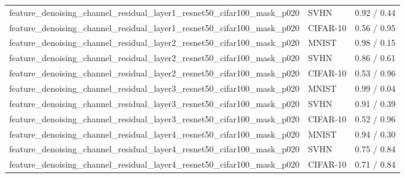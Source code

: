 \begin{tabular}{lll}
feature\_denoising\_channel\_residual\_layer1\_resnet50\_cifar100\_mask\_p020 & SVHN & 0.92 / 0.44 \\
feature\_denoising\_channel\_residual\_layer1\_resnet50\_cifar100\_mask\_p020 & CIFAR-10 & 0.56 / 0.95 \\
feature\_denoising\_channel\_residual\_layer2\_resnet50\_cifar100\_mask\_p020 & MNIST & 0.98 / 0.15 \\
feature\_denoising\_channel\_residual\_layer2\_resnet50\_cifar100\_mask\_p020 & SVHN & 0.86 / 0.61 \\
feature\_denoising\_channel\_residual\_layer2\_resnet50\_cifar100\_mask\_p020 & CIFAR-10 & 0.53 / 0.96 \\
feature\_denoising\_channel\_residual\_layer3\_resnet50\_cifar100\_mask\_p020 & MNIST & 0.99 / 0.04 \\
feature\_denoising\_channel\_residual\_layer3\_resnet50\_cifar100\_mask\_p020 & SVHN & 0.91 / 0.39 \\
feature\_denoising\_channel\_residual\_layer3\_resnet50\_cifar100\_mask\_p020 & CIFAR-10 & 0.52 / 0.96 \\
feature\_denoising\_channel\_residual\_layer4\_resnet50\_cifar100\_mask\_p020 & MNIST & 0.94 / 0.30 \\
feature\_denoising\_channel\_residual\_layer4\_resnet50\_cifar100\_mask\_p020 & SVHN & 0.75 / 0.84 \\
feature\_denoising\_channel\_residual\_layer4\_resnet50\_cifar100\_mask\_p020 & CIFAR-10 & 0.71 / 0.84 \\
\bottomrule
\end{tabular}
